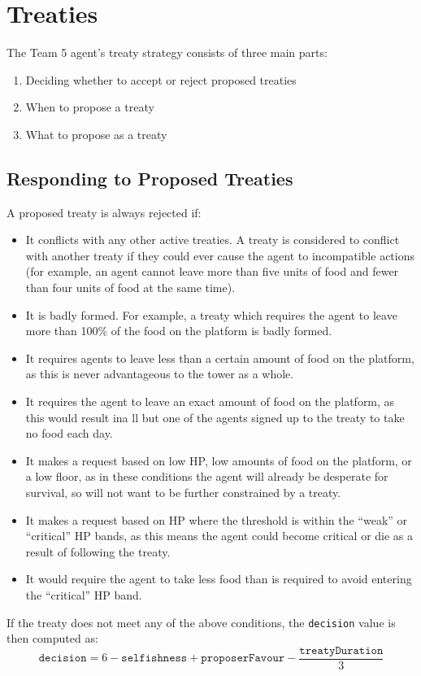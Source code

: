 \section{Treaties}\label{sec:team5-treaties}
The Team 5 agent's treaty strategy consists of three main parts:
\begin{enumerate}
    \item Deciding whether to accept or reject proposed treaties
    \item When to propose a treaty
    \item What to propose as a treaty
\end{enumerate}

\subsection*{Responding to Proposed Treaties}\label{sec:team5-treaties-response}
A proposed treaty is always rejected if:
\begin{itemize}
    \item It conflicts with any other active treaties. A treaty is considered to conflict with another treaty if they could ever cause the agent to incompatible actions (for example, an agent cannot leave more than five units of food and fewer than four units of food at the same time).
    \item It is badly formed. For example, a treaty which requires the agent to leave more than 100\% of the food on the platform is badly formed.
    \item {} It requires agents to leave less than a certain amount of food on the platform, as this is never advantageous to the tower as a whole.
    \item {} It requires the agent to leave an exact amount of food on the platform, as this would result ina ll but one of the agents signed up to the treaty to take no food each day.
    \item It makes a request based on low HP, low amounts of food on the platform, or a low floor, as in these conditions the agent will already be desperate for survival, so will not want to be further constrained by a treaty.
    \item {} It makes a request based on HP where the threshold is within the ``weak'' or ``critical'' HP bands, as this means the agent could become critical or die as a result of following the treaty.
    \item {} It would require the agent to take less food than is required to avoid entering the ``critical'' HP band.
\end{itemize}
If the treaty does not meet any of the above conditions, the \texttt{decision} value is then computed as:
\[\texttt{decision} = 6 - \texttt{selfishness} + \texttt{proposerFavour} - \frac{\texttt{treatyDuration}}{3}\]

